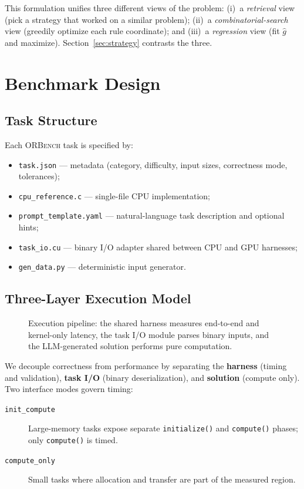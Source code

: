 \documentclass{article}
\begin{document}
This formulation unifies three different views of the problem: (i)~a
\emph{retrieval} view (pick a strategy that worked on a similar
problem); (ii)~a \emph{combinatorial-search} view (greedily optimize
each rule coordinate); and (iii)~a \emph{regression} view (fit
$\hat{g}$ and maximize). Section~\ref{sec:strategy} contrasts the
three.

\section{Benchmark Design}
\label{sec:design}

\subsection{Task Structure}

Each \textsc{ORBench} task is specified by:
\begin{itemize}
  \item \texttt{task.json} --- metadata (category, difficulty, input
        sizes, correctness mode, tolerances);
  \item \texttt{cpu\_reference.c} --- single-file CPU implementation;
  \item \texttt{prompt\_template.yaml} --- natural-language task
        description and optional hints;
  \item \texttt{task\_io.cu} --- binary I/O adapter shared between CPU
        and GPU harnesses;
  \item \texttt{gen\_data.py} --- deterministic input generator.
\end{itemize}

\subsection{Three-Layer Execution Model}

\begin{figure}[ht]
\centering
\caption{Execution pipeline: the shared harness measures end-to-end
and kernel-only latency, the task I/O module parses binary inputs,
and the LLM-generated solution performs pure computation.}
\label{fig:arch}
\end{figure}

We decouple correctness from performance by separating the
\textbf{harness} (timing and validation), \textbf{task I/O} (binary
deserialization), and \textbf{solution} (compute only). Two interface
modes govern timing:
\begin{description}
  \item[\texttt{init\_compute}] Large-memory tasks expose separate
        \texttt{initialize()} and \texttt{compute()} phases; only
        \texttt{compute()} is timed.
  \item[\texttt{compute\_only}] Small tasks where allocation and
        transfer are part of the measured region.
\end{description}
\end{document}

